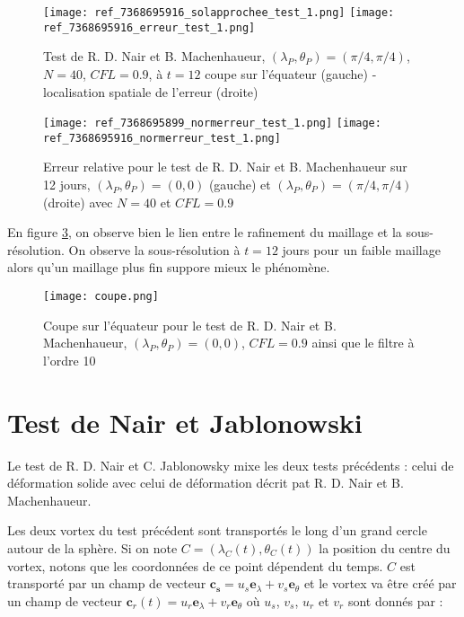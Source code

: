 \begin{figure}[ht]
\begin{center}
\texttt{[image: ref\_7368695916\_solapprochee\_test\_1.png]}
\texttt{[image: ref\_7368695916\_erreur\_test\_1.png]}
\caption{Test de R. D. Nair et B. Machenhaueur, $(\lambda_P, \theta_P) = (\pi/4,\pi/4)$, $N=40$, $CFL=0.9$, à $t=12$ coupe sur l'équateur (gauche) - localisation spatiale de l'erreur (droite)}
\label{fig NM2}
\end{center}
\end{figure}

\begin{figure}[ht]
\begin{center}
\texttt{[image: ref\_7368695899\_normerreur\_test\_1.png]}
\texttt{[image: ref\_7368695916\_normerreur\_test\_1.png]}
\caption{Erreur relative pour le test de R. D. Nair et B. Machenhaueur sur 12 jours,  $(\lambda_P, \theta_P) = (0,0)$ (gauche) et $(\lambda_P, \theta_P) = (\pi/4,\pi/4)$ (droite) avec $N=40$ et $CFL=0.9$}
\label{fig NM3}
\end{center}
\end{figure}

En figure \ref{fig NM4}, on observe bien le lien entre le rafinement du maillage et la sous-résolution. On observe la sous-résolution à $t=12$ jours pour un faible maillage alors qu'un maillage plus fin suppore mieux le phénomène.

\begin{figure}[ht]
\begin{center}
\texttt{[image: coupe.png]}
\caption{Coupe sur l'équateur pour le test de R. D. Nair et B. Machenhaueur, $(\lambda_P, \theta_P) = (0,0)$, $CFL=0.9$ ainsi que le filtre à l'ordre 10}
\label{fig NM4}
\end{center}
\end{figure}


\section{Test de Nair et Jablonowski}

Le test de R. D. Nair et C. Jablonowsky \cite{Nair2008} mixe les deux tests précédents : celui de déformation solide avec celui de déformation décrit pat R. D. Nair et B. Machenhaueur.

Les deux vortex du test précédent sont transportés le long d'un grand cercle autour de la sphère. Si on note $C=(\lambda_C(t), \theta_C(t))$ la position du centre du vortex, notons que les coordonnées de ce point dépendent du temps. $C$ est transporté par un champ de vecteur $\mathbf{c_s} = u_s \mathbf{e}_{\lambda} + v_s \mathbf{e}_{\theta}$ et le vortex va être créé par un champ de vecteur $\mathbf{c}_r(t)=u_r \mathbf{e}_{\lambda} + v_r \mathbf{e}_{\theta}$ où $u_s$, $v_s$, $u_r$ et $v_r$ sont donnés par :

